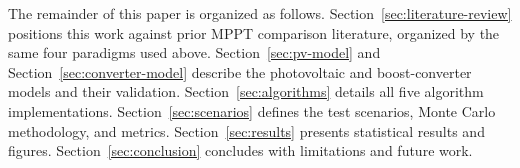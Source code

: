 The remainder of this paper is organized as follows.
Section~\ref{sec:literature-review} positions this work against prior MPPT
comparison literature, organized by the same four paradigms used above.
Section~\ref{sec:pv-model} and Section~\ref{sec:converter-model} describe
the photovoltaic and boost-converter models and their validation.
Section~\ref{sec:algorithms} details all five algorithm implementations.
Section~\ref{sec:scenarios} defines the test scenarios, Monte Carlo
methodology, and metrics. Section~\ref{sec:results} presents statistical
results and figures. Section~\ref{sec:conclusion} concludes with
limitations and future work.
